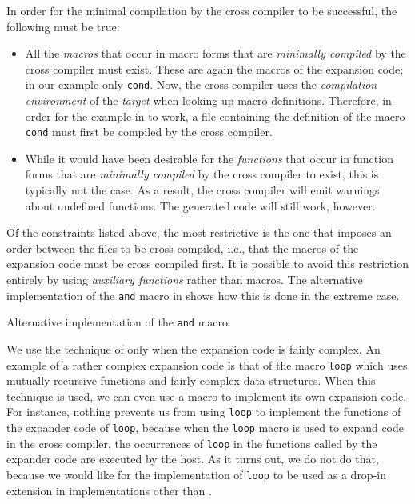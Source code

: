 In order for the minimal compilation by the cross compiler to be
successful, the following must be true:

\begin{itemize}
\item All the \emph{macros} that occur in macro forms that are
  \emph{minimally compiled} by the cross compiler must exist.  These
  are again the macros of the expansion code; in our example only
  \texttt{cond}.  Now, the cross compiler uses the \emph{compilation
    environment} of the \emph{target} when looking up macro
  definitions.  Therefore, in order for the example in
   to work, a file containing the
  definition of the macro \texttt{cond} must first be compiled by the
  cross compiler. 
\item While it would have been desirable for the \emph{functions} that
  occur in function forms that are \emph{minimally compiled} by the
  cross compiler to exist, this is typically not the case.%
  As a
  result, the cross compiler will emit warnings about undefined
  functions.  The generated code will still work, however.
\end{itemize}

Of the constraints listed above, the most restrictive is the one that
imposes an order between the files to be cross compiled, i.e., that
the macros of the expansion code must be cross compiled first.  It is
possible to avoid this restriction entirely by using \emph{auxiliary
  functions} rather than macros.  The alternative implementation of
the \texttt{and} macro in  shows how this
is done in the extreme case.

\begin{codefragment}
\caption{\label{code-defmacro-and-2}
Alternative implementation of the \texttt{and} macro.}
\end{codefragment}

We use the technique of  only when the
expansion code is fairly complex.  An example of a rather complex
expansion code is that of the macro \texttt{loop} which uses mutually
recursive functions and fairly complex data structures.  When this
technique is used, we can even use a macro to implement its own
expansion code.  For instance, nothing prevents us from using
\texttt{loop} to implement the functions of the expander code of
\texttt{loop}, because when the \texttt{loop} macro is used to expand
code in the cross compiler, the occurrences of \texttt{loop} in the
functions called by the expander code are executed by the host.  As it
turns out, we do not do that, because we would like for the \sysname{}
implementation of \texttt{loop} to be used as a drop-in extension in
implementations other than \sysname{}.


